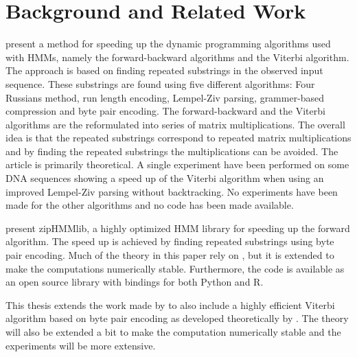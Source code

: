 \chapter{Background and Related Work}


\citet{lifshits2009speeding} present a method for speeding up the dynamic
programming algorithms used with HMMs, namely the forward-backward algorithms
and the Viterbi algorithm. The approach is based on finding repeated substrings
in the observed input sequence. These substrings are found using five different
algorithms: Four Russians method, run length encoding, Lempel-Ziv parsing,
grammer-based compression and byte pair encoding. The forward-backward and the
Viterbi algorithms are the reformulated into series of matrix
multiplications. The overall idea is that the repeated substrings correspond to
repeated matrix multiplications and by finding the repeated substrings the
multiplications can be avoided. The article is primarily theoretical. A single
experiment have been performed on some DNA sequences showing a speed up of the
Viterbi algorithm when using an improved Lempel-Ziv parsing without
backtracking. No experiments have been made for the other algorithms and no
code has been made available.

\citet{sand2013ziphmmlib} present zipHMMlib, a highly optimized HMM library for
speeding up the forward algorithm. The speed up is achieved by finding repeated
substrings using byte pair encoding. Much of the theory in this paper rely on
\cite{lifshits2009speeding}, but it is extended to make the computations
numerically stable. Furthermore, the code is available as an open source
library with bindings for both Python and R.

This thesis extends the work made by \citet{sand2013ziphmmlib} to also include
a highly efficient Viterbi algorithm based on byte pair encoding as developed
theoretically by \citet{lifshits2009speeding}. The theory will also be extended
a bit to make the computation numerically stable and the experiments will be
more extensive.

